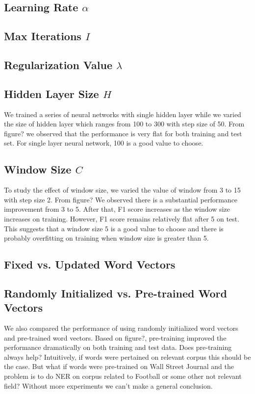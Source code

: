 \documentclass[11pt, oneside]{article}   	%
\begin{document}
\subsection{Learning Rate $\alpha$}
\subsection{Max Iterations $I$}
\subsection{Regularization Value $\lambda$}
\subsection{Hidden Layer Size $H$}
We trained a series of neural networks with single hidden layer while we varied the size of hidden layer which ranges from 100 to 300 with step size of 50. From figure? we observed that the performance is very flat for both training and test set. For single layer neural network, 100 is a good value to choose. 

\subsection{Window Size $C$}
To study the effect of window size, we varied the value of window from 3 to 15 with step size 2. From figure? We observed there is a substantial performance improvement from 3 to 5. After that, F1 score increases as the window size increases on training. However, F1 score remains relatively flat after 5 on test. This suggests that a window size 5 is a good value to choose and there is probably overfitting on training when window size is greater than 5. 

\subsection{Fixed vs. Updated Word Vectors}

\subsection{Randomly Initialized vs. Pre-trained Word Vectors}
We also compared the performance of using randomly initialized word vectors and pre-trained word vectors. Based on figure?, pre-training improved the performance dramatically on both training and test data. Does pre-training always help? Intuitively, if words were pertained on relevant corpus this should be the case. But what if words were pre-trained on Wall Street Journal and the problem is to do NER on corpus related to Football or some other not relevant field? Without more experiments we can't make a general conclusion. 
\end{document}
